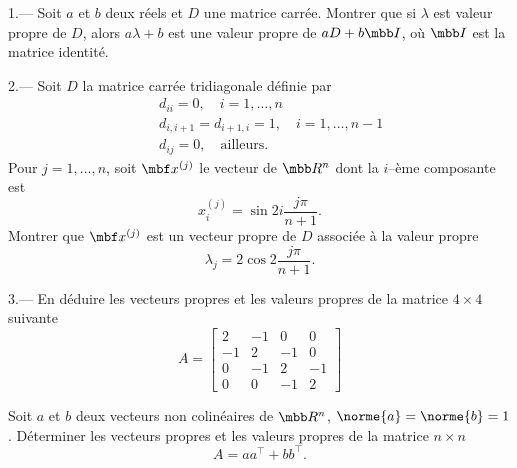 \begin{exo}\rm
1.--- Soit $a$ et $b$ deux réels et $D$ une matrice carrée. Montrer que si
$\lambda$ est valeur propre de $D$, alors $a\lambda+b$ est une valeur
propre de $aD+b\mbb I$, o\`u $\mbb I$ est la matrice identité.

2.--- Soit $D$ la matrice carrée tridiagonale définie par
\begin{eqnarray*}
&&d_{ii}=0,\quad i=1,\ldots,n\\
&&d_{i,i+1}=d_{i+1,i}=1,\quad i=1,\ldots,n-1\\
&&d_{ij}=0,\quad\mbox{ailleurs}.
\end{eqnarray*}
Pour $j=1,\ldots,n$, soit $\mbf x^{(j)}$ le vecteur de $\mbb R^n$ dont
la $i$--ème composante est
$$
x_i^{(j)}=\sin 2i\frac{j\pi}{n+1}.
$$
Montrer que $\mbf x^{(j)}$ est un vecteur propre de $D$ associée à la
valeur propre 
$$
\lambda_j=2\cos 2\frac{j\pi}{n+1}.
$$

3.--- En déduire les vecteurs propres et les valeurs propres de la
matrice $4\times 4$ suivante
$$
A=\left[\begin{array}{rrrr}
	2 & -1 &  0 &  0\\
       -1 &  2 & -1 &  0\\
        0 & -1 &  2 & -1\\
        0 &  0 & -1 &  2
        \end{array}
  \right]
$$
\end{exo}


 



 

\begin{exo}\rm
Soit $a$ et $b$ deux vecteurs non colinéaires de $\mbb R^n$, $\norme{a}=\norme{b}=1$. Déterminer
les vecteurs propres et les valeurs propres de la matrice $n\times n$
$$
A=aa^\top +bb^\top .
$$
\end{exo}

 

